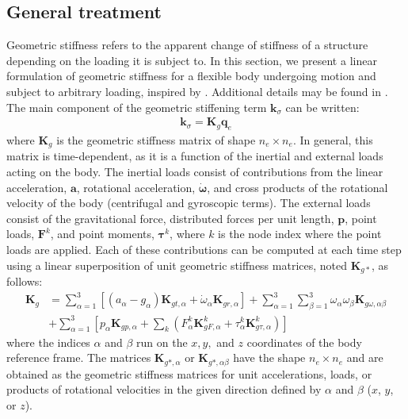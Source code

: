 \documentclass[wes, manuscript]{copernicus}
\renewcommand{\v}[1]{\boldsymbol{#1}}
\newcommand{\m}[1]{\boldsymbol{#1}}
\begin{document}
\subsection{General treatment}
Geometric stiffness refers to the apparent change of stiffness of a structure depending on the loading it is subject to.
% 
In this section, we present a linear formulation of geometric stiffness for a flexible body undergoing motion and subject to arbitrary loading, inspired by \cite{Schwertassek:book}. 
Additional details may be found in \cite{Wallrapp:1991}.
The main component of the geometric stiffening term $\v{k}_\sigma$ can be written:
\begin{align}
  \v{k}_\sigma = \m{K}_g  \v{q}_e
      \label{eq:kSigma}
\end{align}
where $\m{K}_g$ is the geometric stiffness matrix of shape $n_e\times n_e$.
In general, this matrix is time-dependent, as it is a function of the inertial and external loads acting on the body.
The inertial loads consist of contributions from the linear acceleration, $\v{a}$, rotational acceleration, $\v{\dot{\omega}}$, and cross products of the rotational velocity of the body (centrifugal and gyroscopic terms).
% 
The external loads consist of the gravitational force, distributed forces per unit length, $\v{p}$, point loads, $\v{F}^k$, and point moments, $\v{\tau}^k$, where $k$ is the node index where the point loads are applied. Each of these contributions can be computed at each time step using a linear superposition of unit geometric stiffness matrices, noted $\m{K}_{g*}$, as follows:
\begin{align}
    \m{K}_g &= 
    \sum\limits_{\alpha=1}^3 \left[ 
      \left(a_\alpha - g_\alpha \right) \m{K}_{gt,\alpha}
     + \dot{\omega}_\alpha \m{K}_{gr,\alpha}
     \right]
     + \sum\limits_{\alpha=1}^3\sum\limits_{\beta=1}^3  \omega_\alpha\omega_\beta \m{K}_{g\omega,\alpha\beta} 
      \nonumber\\
      &
      + \sum\limits_{\alpha=1}^3   \left[
       p_\alpha \m{K}_{gp,\alpha}
      + \sum\limits_{k} 
         \left (  F_\alpha^k \m{K}_{gF,\alpha}^k +\tau_\alpha^k \m{K}_{g\tau,\alpha}^k\right)
       \right]
       \label{eq:GeomStiff}
\end{align}
where the indices $\alpha$ and $\beta$ run on the $x, y,$ and $z$ coordinates of the body reference frame. 
The matrices $\m{K}_{g*,\alpha}$ or $\m{K}_{g*,\alpha\beta}$ have the shape $n_e\times n_e$ and are obtained as the geometric stiffness matrices for unit accelerations, loads, or products of rotational velocities in the given direction defined by $\alpha$ and $\beta$ ($x$, $y$, or $z$).
\end{document}
